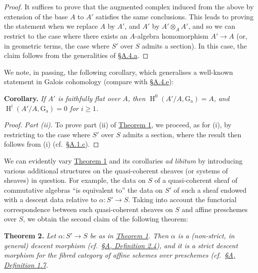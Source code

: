 \documentclass{article}
\newenvironment{itenv}[1]
  {\phantomsection\par\smallskip\noindent\textbf{#1.}\itshape}
  {\par\smallskip}
\newcommand{\oldpage}[1]{\marginpar{\footnotesize$\Big\vert$ \textit{p.~#1}}}
\theoremstyle{definition}
\theoremstyle{definition}
\theoremstyle{definition}
\theoremstyle{definition}
\theoremstyle{remark}
\begin{document}
\begin{proof}
It suffices to prove that the augmented complex induced from the above by extension of the base \(A\) to \(A'\) satisfies the same conclusions.
This leads to proving the statement when we replace \(A\) by \(A'\), and \(A'\) by \(A'\otimes_A A'\), and so we can restrict to the case where there exists an \(A\)-algebra homomorphism \(A'\to A\) (or, in geometric terms, the case where \(S'\) over \(S\) admits a section).
In this case, the claim follows from the generalities of \protect\hyperlink{fga-3-i-section-A.4.a}{§A.4.a}.
\end{proof}

We note, in passing, the following corollary, which generalises a well-known statement in Galois cohomology (compare with \protect\hyperlink{fga-3-i-section-A.4.e}{§A.4.e}):

\begin{itenv}{Corollary}
If \(A'\) is faithfully flat over \(A\), then \(\operatorname{H}^0(A'/A,\operatorname{G_a})=A\), and \(\operatorname{H}^i(A'/A,\operatorname{G_a})=0\) for \(i\geqslant 1\).

\end{itenv}

\begin{proof}
\emph{Part (ii).}
To prove part (ii) of \protect\hyperlink{fga-3-i-section-B.1-theorem-1}{Theorem 1}, we proceed, as for (i), by restricting to the case where \(S'\) over \(S\) admits a section, where the result then follows from (i) (cf.~\protect\hyperlink{fga-3-i-section-A.1.c}{§A.1.c}).
\end{proof}

We can evidently vary \protect\hyperlink{fga-3-i-section-B.1-theorem-1}{Theorem 1} and its corollaries \emph{ad libitum} by introducing various additional structures on the quasi-coherent sheaves (or systems of sheaves) in question.
\oldpage{190-19}For example, the data on \(S\) of a quasi-coherent sheaf of commutative algebras ``is equivalent to'' the data on \(S'\) of such a sheaf endowed with a descent data relative to \(\alpha\colon S'\to S\).
Taking into account the functorial correspondence between such quasi-coherent sheaves on \(S\) and affine preschemes over \(S\), we obtain the second claim of the following theorem:

\leavevmode{}%
\begin{itenv}{Theorem 2}
Let \(\alpha\colon S'\to S\) be as in \protect\hyperlink{fga-3-i-section-B.1-theorem-1}{Theorem 1}.
Then \(\alpha\) is a (non-strict, in general) \emph{descent morphism} (cf.~\protect\hyperlink{fga-3-i-section-A-definition-2.4}{§A, Definition 2.4}), and it is a \emph{strict descent morphism} for the fibred category of affine schemes over preschemes (cf.~\protect\hyperlink{fga-3-i-section-A.1-definition-1.7}{§A, Definition 1.7}.

\end{itenv}
\end{document}
